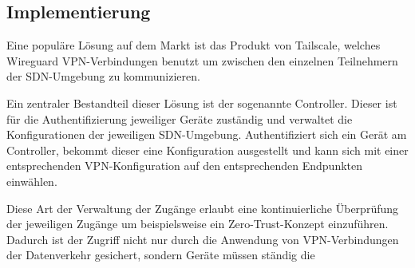 \subsection{Implementierung}

Eine populäre Lösung auf dem Markt ist das Produkt von Tailscale, welches Wireguard VPN-Verbindungen benutzt um zwischen den einzelnen Teilnehmern der SDN-Umgebung zu kommunizieren.

Ein zentraler Bestandteil dieser Lösung ist der sogenannte Controller. Dieser ist für die Authentifizierung jeweiliger Geräte zuständig und verwaltet die Konfigurationen der jeweiligen SDN-Umgebung. Authentifiziert sich ein Gerät am Controller, bekommt dieser eine Konfiguration ausgestellt und kann sich mit einer entsprechenden VPN-Konfiguration auf den entsprechenden Endpunkten einwählen.

Diese Art der Verwaltung der Zugänge erlaubt eine kontinuierliche Überprüfung der jeweiligen Zugänge um beispielsweise ein Zero-Trust-Konzept einzuführen. Dadurch ist der Zugriff nicht nur durch die Anwendung von VPN-Verbindungen der Datenverkehr gesichert, sondern Geräte müssen ständig die 

\cite{tailscale202_how_it_works}
